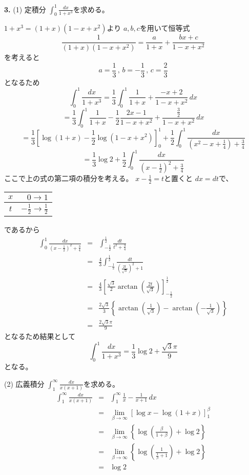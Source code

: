 \documentclass[dvipdfmx,twocolumn]{jsarticle}
\begin{document}
\textbf{3.}
(1)
定積分 $\int_0^1 \frac{dx}{1 + x^3}$を求める。

$1 + x^3 = (1 + x)(1 - x + x^2)$より
$a,b,c$を用いて恒等式
\[
\frac{1}{(1 + x)(1 - x + x^2)} = \frac{a}{1 + x} + \frac{bx + c}{1 - x + x^2}
\]
を考えると
\[
a = \frac{1}{3} \, , \, b = - \frac{1}{3} \, , \, c = \frac{2}{3}
\]
となるため
\[\int_0^1 \frac{dx}{1 + x^3} =  \frac{1}{3} \int_0^1 \frac{1}{1 + x} + \frac{- x + 2}{1 - x + x^2} \, dx\]
 \[=  \frac{1}{3} \int_0^1 \frac{1}{1 + x} - \frac{1}{2} \frac{2x - 1}{1 - x + x^2} + \frac{\frac{3}{2}}{1 - x + x^2} \, dx \]
 \[=  \frac{1}{3} \left[ \log (1 + x) - \frac{1}{2} \log (1 - x + x^2) \right]_0^1 + \frac{1}{2} \int_0^1 \frac{dx}{(x^2 - x + \frac{1}{4}) + \frac{3}{4}}\]
 \[ = \frac{1}{3} \log 2 + \frac{1}{2} \int_0^1 \frac{dx}{(x - \frac{1}{2})^2 + \frac{3}{4}}\]
ここで上の式の第二項の積分を考える。
$x - \frac{1}{2} = t$と置くと $dx = dt$で、
\begin{table}[h]
  \begin{tabular}{c|r}
    $x$ & $0 \longrightarrow 1$ \\ \hline
    $t$ & $- \frac{1}{2} \longrightarrow \frac{1}{2}$
  \end{tabular}
\end{table}

であるから
\begin{eqnarray*}
\int_0^1 \frac{dx}{(x - \frac{1}{2})^2 + \frac{3}{4}} & = & \int_{- \frac{1}{2}}^{\frac{1}{2}} \frac{dt}{t^2 + \frac{3}{4}} \\
& = & \frac{4}{3} \int_{- \frac{1}{2}}^{\frac{1}{2}} \frac{dt}{\left( \frac{2t}{\sqrt{3}} \right)^2 + 1} \\
& = & \frac{4}{3} \left[ \frac{\sqrt{3}}{2} \arctan \left( \frac{2t}{\sqrt{3}} \right) \right]_{- \frac{1}{2}}^{\frac{1}{2}} \\
& = & \frac{2 \sqrt{3}}{3} \left\{ \arctan \left( \frac{1}{\sqrt{3}} \right) - \arctan \left( - \frac{1}{\sqrt{3}} \right) \right\} \\
& = & \frac{2 \sqrt{3} \pi}{9}
\end{eqnarray*}
となるため結果として
\[
\int_0^1 \frac{dx}{1 + x^3} = \frac{1}{3} \log 2 + \frac{\sqrt{3} \pi}{9}
\]
となる。

(2)
広義積分 $\int_1^\infty \frac{dx}{x (x + 1)}$を求める。
\begin{eqnarray*}
  \int_1^\infty \frac{dx}{x (x + 1)}
  & = & \int_1^\infty \frac{1}{x} - \frac{1}{x + 1} \, dx \\
  & = & \lim_{\beta \to \infty} \left[ \log x - \log (1 + x) \right]_1^\beta \\
  & = & \lim_{\beta \to \infty} \left\{ \log \left( \frac{\beta}{1 + \beta} \right) + \log 2 \right\} \\
  & = & \lim_{\beta \to \infty} \left\{ \log \left( \frac{1}{\frac{1}{\beta} + 1} \right) + \log 2 \right\} \\
  & = & \log 2 \\
\end{eqnarray*}
\end{document}
